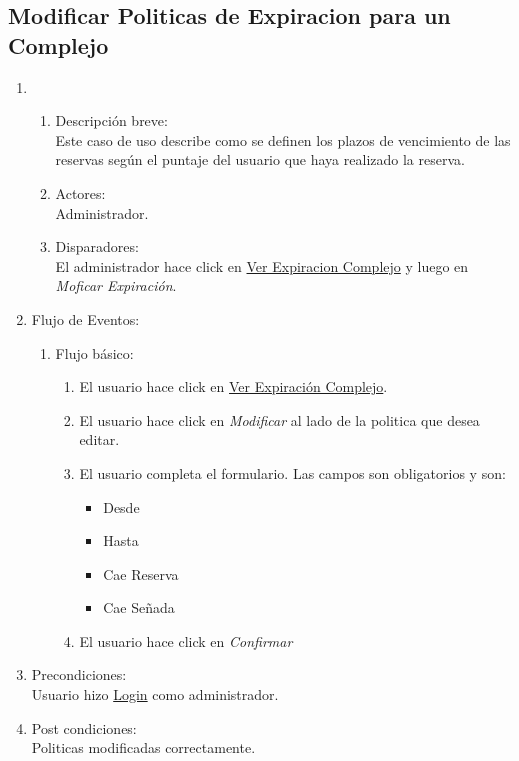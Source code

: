 \documentclass[a4paper,11pt]{article}
\begin{document}
\subsection{Modificar Politicas de Expiracion para un Complejo} 
\begin{enumerate}
    \item
    \begin{enumerate}
    \item Descripci\'on breve: \\
        Este caso de uso describe como se definen los plazos de vencimiento de
        las reservas seg\'un el puntaje del usuario que haya realizado la reserva.
    \item Actores: \\
        Administrador.
    \item Disparadores: \\
        El administrador hace click en \underline{Ver Expiracion Complejo} y luego en \emph{Moficar Expiraci\'on}.
    \end{enumerate}
    \item Flujo de Eventos: 
    \begin{enumerate}
        \item Flujo b\'asico:
		\begin{enumerate}
            		\item El usuario hace click en \underline{Ver Expiraci\'on Complejo}.
            		\item El usuario hace click en \emph{Modificar} al lado de la politica que desea editar.
            		\item El usuario completa el formulario. Las campos son obligatorios y son:
            		\begin{itemize}
				\item Desde
				\item Hasta
				\item Cae Reserva
				\item Cae Se\~nada
			\end{itemize}
			\item El usuario hace click en \emph{Confirmar}
		\end{enumerate}
    \end{enumerate}
    \item Precondiciones: \\
        Usuario hizo \underline{Login} como administrador.
    \item Post condiciones: \\
        Politicas modificadas correctamente.
\end{enumerate}
\end{document}
